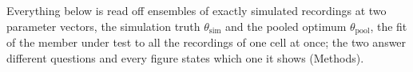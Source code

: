 Everything below is read off ensembles of exactly simulated recordings at two parameter vectors,
the simulation truth $\theta_{\mathrm{sim}}$ and the pooled optimum $\theta_{\mathrm{pool}}$, the
fit of the member under test to all the recordings of one cell at once; the two answer different
questions and every figure states which one it shows (Methods).

